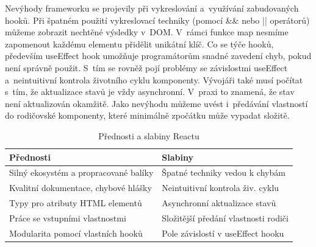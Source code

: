 Nevýhody frameworku se projevily při vykreslování a~využívání zabudovaných hooků. 
Při špatném použití vykreslovací techniky (pomocí \&\& nebo || operátorů) můžeme zobrazit nechtěné výsledky v~DOM. 
V~rámci funkce map nesmíme zapomenout každému elementu přidělit unikátní klíč. 
Co se týče hooků, především useEffect hook umožňuje programátorům snadné zavedení chyb, pokud není správně použit. 
S~tím se rovněž pojí problémy se závislostmi useEffect a~neintuitivní kontrola životního cyklu komponenty. 
Vývojáři také musí počítat s~tím, že aktualizace stavů je vždy asynchronní. V~praxi to znamená, že stav není aktualizován okamžitě. 
Jako nevýhodu můžeme uvést i~předávání vlastností do rodičovské komponenty, které minimálně zpočátku může vypadat složitě.

\begin{table}[htb]
	\centering
	\caption{Přednosti a slabiny Reactu}
	\medskip
	\radkovani[1.2]
		\begin{tabular}{|l|l|}
		\hline
		\textbf{Přednosti}											& \textbf{Slabiny}                    	\\ \hline
		Silný ekosystém a propracované balíky		& Špatné techniky vedou k chybám 				\\ \hline
		Kvalitní dokumentace, chybové hlášky		& Neintuitivní kontrola živ. cyklu   		\\ \hline
		Typy pro atributy HTML elementů					& Asynchronní aktualizace stavů					\\ \hline
		Práce se vstupními vlastnostmi					& Složitější předání vlastnosti rodiči	\\ \hline
		Modularita pomocí vlastních hooků				& Pole závislostí v useEffect hooku			\\ \hline
		\end{tabular}
	\label{tab:reacttabulka}
\end{table}


